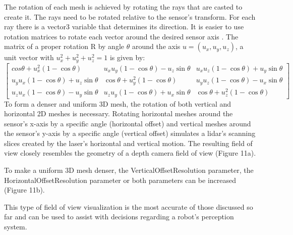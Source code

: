 \documentclass{article}
\begin{document}
The rotation of each mesh is achieved by rotating the rays that are casted to create it. The rays need to be rotated relative to the sensor's transform. For each ray there is a vector3 variable that determines its direction. It is easier to use rotation matrices to rotate each vector around the desired sensor axis \cite{noauthor_rotation_2022}. The matrix of a proper rotation R by angle $\theta$ around the axis $u = (u_x, u_y, u_z)$, a unit vector with $ u_x^2 + u_y^2 + u_z^2 = 1 $ is given by:
\\

$
\begin{bmatrix}
cos \theta + u_x^2(1 - \cos \theta) & u_xu_y(1 - \cos \theta)  - u_z\sin \theta & u_xu_z(1 - \cos \theta) + u_y\sin \theta
\\
u_yu_x(1 - \cos \theta) + u_z\sin \theta & \cos \theta + u_y^2(1 - \cos \theta) & u_yu_z(1 - \cos \theta) - u_x\sin \theta
\\
u_zu_x(1 - \cos \theta) - u_y\sin \theta & u_zu_y(1 - \cos \theta) + u_x\sin \theta & \cos \theta + u_z^2(1 - \cos \theta) 
\end{bmatrix}
$
\\

To form a denser and uniform 3D mesh, the rotation of both vertical and horizontal 2D meshes is necessary. Rotating horizontal meshes around the sensor's x-axis by a specific angle (horizontal offset) and vertical meshes around the sensor's y-axis by a specific angle (vertical offset) simulates a lidar's scanning slices created by the laser's horizontal and vertical motion. The resulting field of view closely resembles the geometry of a depth camera field of view (Figure 11a).

To make a uniform 3D mesh denser, the VerticalOffsetResolution parameter, the HorizontalOffsetResolution parameter or both parameters can be increased (Figure 11b).

This type of field of view visualization is the most accurate of those discussed so far and can be used to assist with decisions regarding a robot's perception system. 
\end{document}
